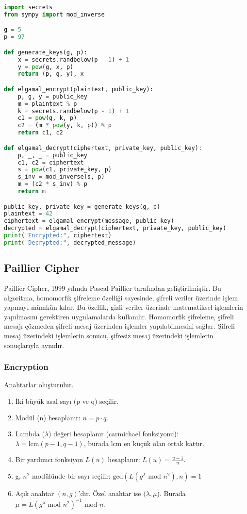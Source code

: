 \begin{lstlisting}[language=Python]
import secrets
from sympy import mod_inverse

g = 5
p = 97

def generate_keys(g, p):
    x = secrets.randbelow(p - 1) + 1
    y = pow(g, x, p)
    return (p, g, y), x

def elgamal_encrypt(plaintext, public_key):
    p, g, y = public_key
    m = plaintext % p
    k = secrets.randbelow(p - 1) + 1
    c1 = pow(g, k, p)
    c2 = (m * pow(y, k, p)) % p
    return c1, c2

def elgamal_decrypt(ciphertext, private_key, public_key):
    p, _, _ = public_key
    c1, c2 = ciphertext
    s = pow(c1, private_key, p)
    s_inv = mod_inverse(s, p)
    m = (c2 * s_inv) % p
    return m

public_key, private_key = generate_keys(g, p)
plaintext = 42
ciphertext = elgamal_encrypt(message, public_key)
decrypted = elgamal_decrypt(ciphertext, private_key, public_key)
print("Encrypted:", ciphertext)
print("Decrypted:", decrypted_message)
\end{lstlisting}

\newpage

\subsection{Paillier Cipher}

Paillier Cipher, 1999 yılında Pascal Paillier tarafından geliştirilmiştir. Bu algoritma, homomorfik şifreleme özelliği sayesinde, şifreli veriler üzerinde işlem yapmayı mümkün kılar. Bu özellik, gizli veriler üzerinde matematiksel işlemlerin yapılmasını gerektiren uygulamalarda kullanılır. Homomorfik şifreleme, şifreli mesajı çözmeden şifreli mesaj üzerinden işlemler yapılabilmesini sağlar. Şifreli mesaj üzerindeki işlemlerin sonucu, şifresiz mesaj üzerindeki işlemlerin sonuçlarıyla aynıdır.

\subsubsection{Encryption}

Anahtarlar oluşturulur.

\begin{enumerate}
    \item İki büyük asal sayı (p ve q) seçilir.
    \item Modül (n) hesaplanır: $n = p \cdot q$.
    \item Lambda ($\lambda$) değeri hesaplanır (carmichael fonksiyonu): $\lambda = \text{lcm}(p - 1, q - 1)$, burada lcm en küçük olan ortak kattır.
    \item Bir yardımcı fonksiyon $L(u)$ hesaplanır: $L(u) = \frac{u - 1}{n}$.
    \item g, $n^2$ modülünde bir sayı seçilir: $\text{gcd}(L(g^{\lambda} \text{ mod } n^2), n) = 1$
    \item Açık anahtar $(n, g)$'dir. Özel anahtar ise $(\lambda, \mu$). Burada $\mu = L(g^{\lambda} \text{ mod } n^2)^{-1} \text{ mod } n$.
\end{enumerate}

